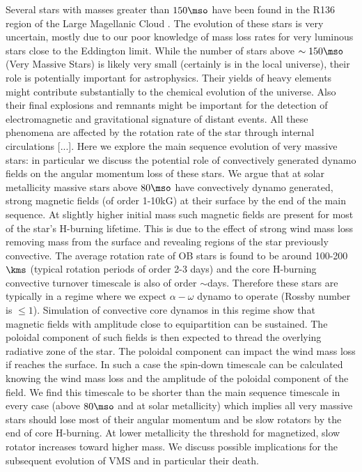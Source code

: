 Several stars with masses greater than $150\mso$ have been found in the R136 region of the Large Magellanic Cloud  \cite{sof_Parker_Goodwin_Kassim_2010}. The evolution of these stars is very uncertain, mostly due to our poor knowledge of mass loss rates for very luminous stars close to the Eddington limit. While the number of stars above $\sim 150\mso$ (Very Massive Stars) is likely very small (certainly is in the local universe), their role is potentially important for astrophysics. Their yields of heavy elements might contribute substantially to the chemical evolution of the universe. Also their final explosions and remnants might be important for the detection of electromagnetic and gravitational signature of distant events. All these phenomena are affected by the rotation rate of the star through internal circulations [...]. Here we explore the main sequence evolution of very massive stars: in particular we discuss the potential role of convectively generated dynamo fields on the angular momentum loss of these stars. We argue that at solar metallicity massive stars above $80\mso$ have convectively dynamo generated, strong magnetic fields (of order 1-10kG) at their surface by the end of the main sequence. At slightly higher initial mass such magnetic fields are present for most of the star's H-burning lifetime. This is due to the effect of strong wind mass loss removing mass from the surface and revealing regions of the star previously convective. The average rotation rate of OB stars is found to be around 100-200$\kms$ (typical rotation periods of order 2-3 days) and the core H-burning convective turnover timescale is also of order $\sim$days. Therefore these stars are typically in a regime where we expect $\alpha-\omega$ dynamo to operate (Rossby number is $\le 1$). Simulation of convective core dynamos in this regime show that magnetic fields with amplitude close to equipartition can be sustained. The poloidal component of such fields is then expected to thread the overlying radiative zone of the star. The poloidal component can impact the wind mass loss if reaches the surface.  In such a case the spin-down timescale can be calculated knowing the wind mass loss and the amplitude of the poloidal component of the field. We find this timescale to be shorter than the main sequence timescale in every case (above $80\mso$ and at solar metallicity) which implies all very massive stars should lose most of their angular momentum and be slow rotators by the end of core H-burning. At lower metallicity the threshold for magnetized, slow rotator increases toward higher mass. We discuss possible implications for the subsequent evolution of VMS and in particular their death. 